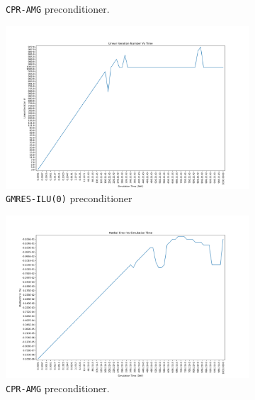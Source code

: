 \begin{figure}
\begin{subfigure}{.5\textwidth}
  \caption{\texttt{CPR-AMG} preconditioner.}
	\label{case1_its_cpr}
\end{subfigure}%
\begin{subfigure}{.5\textwidth}
  \centering
  \includegraphics[width=1.1\linewidth]{figures/case1/ilu/its_time.png_reduced.png}
  \caption{\texttt{GMRES-ILU(0)} preconditioner}
	\label{case1_its_ilu}
\end{subfigure}
\begin{subfigure}{.5\textwidth}
  \centering
  \includegraphics[width=1.1\linewidth]{figures/case1/cpr/matbalerr_time.png_reduced.png}
  \caption{\texttt{CPR-AMG} preconditioner.}
	\label{case1_matbalerr_cpr}
\end{subfigure}%
\begin{subfigure}{.5\textwidth}
  \centering

\end{subfigure}
\end{figure}
